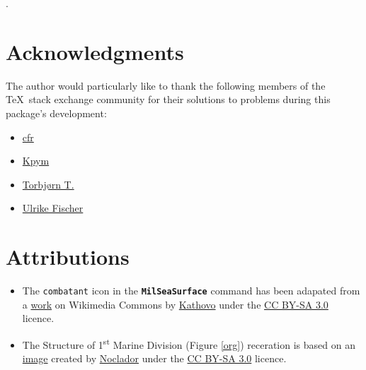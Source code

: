 \documentclass[a4paper, titlepage]{article}
\begin{document}
\clearpage

\begin{versionhistory}
\renewcommand \vhAuthorColWidth{6cm}
.
\end{versionhistory}

\clearpage

\section*{Acknowledgments}

The author would particularly like to thank the following members of the \TeX\  stack exchange community for their solutions to problems during this package\rq{}s development:

\begin{itemize}
\item \href{https://tex.stackexchange.com/users/39222}{cfr}
\item \href{https://tex.stackexchange.com/users/9335}{Kpym}
\item \href{https://tex.stackexchange.com/users/586}{Torbj\o rn T.}
\item \href{https://tex.stackexchange.com/users/2388}{Ulrike Fischer}
\end{itemize}

\section*{Attributions}

\begin{itemize}
\item The \texttt{combatant} icon in the \textbf{\texttt{MilSeaSurface}} command has been adapated from a \href{https://commons.wikimedia.org/wiki/File:Small_battle_symbol.svg}{work} on Wikimedia Commons by \href{https://commons.wikimedia.org/wiki/User:Kathovo}{Kathovo} under the \href{https://creativecommons.org/licenses/by-sa/3.0/}{CC BY-SA 3.0} licence.
\item The Structure of 1\textsuperscript{st} Marine Division (Figure \ref{org}) receration is based on an \href{https://commons.wikimedia.org/wiki/File:1st_US_Marine_Division.png}{image} created by \href{https://commons.wikimedia.org/wiki/User:Noclador}{Noclador} under the \href{https://creativecommons.org/licenses/by-sa/3.0/}{CC BY-SA 3.0} licence.
\end{itemize}
\end{document}
